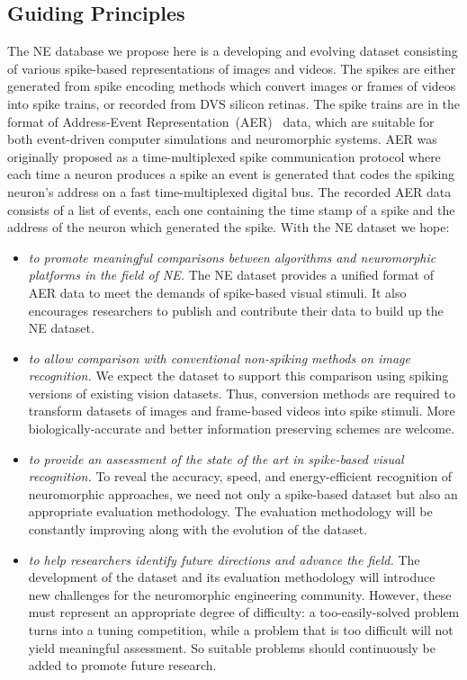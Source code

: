 \subsection{Guiding Principles}
The NE database we propose here is a developing and evolving dataset consisting of various spike-based representations of images and videos.
The spikes are either generated from spike encoding methods which convert images or frames of videos into spike trains, or recorded from DVS silicon retinas.
The spike trains are in the format of Address-Event Representation~(AER)~\citep{mahowald1992vlsi} data, which are suitable for both event-driven computer simulations and neuromorphic systems.
AER was originally proposed as a time-multiplexed spike communication protocol where each time a neuron produces a spike an event is generated that codes the spiking neuron's address on a fast time-multiplexed digital bus.
The recorded AER data consists of a list of events, each one containing the time stamp of a spike and the address of the neuron which generated the spike.
With the NE dataset we hope:
\begin{itemize}
	\item \textit{to promote meaningful comparisons between algorithms and neuromorphic platforms in the field of NE.}
	The NE dataset provides a unified format of AER data to meet the demands of spike-based visual stimuli.
	It also encourages researchers to publish and contribute their data to build up the NE dataset.
	\item \textit{to allow comparison with conventional non-spiking methods on image recognition.}
	We expect the dataset to support this comparison using spiking versions of existing vision datasets.
	Thus, conversion methods are required to transform datasets of images and frame-based videos into spike stimuli.
	More biologically-accurate and better information preserving schemes are welcome.
	
	\item \textit{to provide an assessment of the state of the art in spike-based visual recognition.}
	To reveal the accuracy, speed, and energy-efficient recognition of neuromorphic approaches, we need not only a spike-based dataset but also an appropriate evaluation methodology.
	The evaluation methodology will be constantly improving along with the evolution of the dataset.
	\item \textit{to help researchers identify future directions and advance the field.}
	The development of the dataset and its evaluation methodology will introduce new challenges for the neuromorphic engineering community.
	However, these must represent an appropriate degree of difficulty: a too-easily-solved problem turns into a tuning competition, while a problem that is too difficult will not yield meaningful assessment.
	So suitable problems should continuously be added to promote future research.  
\end{itemize}


